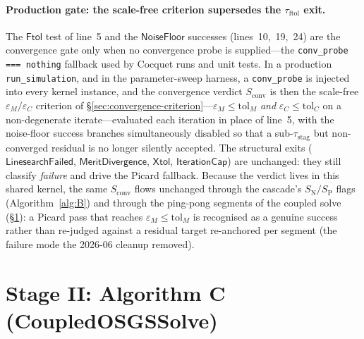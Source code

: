 \documentclass{article}
\newcommand{\code}[1]{\texttt{\small #1}}
\newcommand{\textftol}{\tau_{\mathrm{ftol}}}
\newcommand{\textstag}{\tau_{\mathrm{stag}}}
\begin{document}
\paragraph{Production gate: the scale-free criterion supersedes the $\textftol$ exit.}
The $\mathsf{Ftol}$ test of line~5 and the $\mathsf{NoiseFloor}$ successes
(lines~10,~19,~24) are the convergence gate only when no convergence probe is
supplied---the \code{conv\_probe === nothing} fallback used by Cocquet runs and unit
tests. In a production \code{run\_simulation}, and in the parameter-sweep harness, a
\code{conv\_probe} is injected into every kernel instance, and the convergence
verdict $S_{\mathrm{conv}}$ is then the scale-free $\varepsilon_M/\varepsilon_C$
criterion of §\ref{sec:convergence-criterion}---$\varepsilon_M\le\mathrm{tol}_M$
\emph{and} $\varepsilon_C\le\mathrm{tol}_C$ on a non-degenerate iterate---evaluated
each iteration in place of line~5, with the noise-floor success branches
simultaneously disabled so that a sub-$\textstag$ but non-converged residual is no
longer silently accepted. The structural exits ($\mathsf{LinesearchFailed}$,
$\mathsf{MeritDivergence}$, $\mathsf{Xtol}$, $\mathsf{IterationCap}$) are unchanged:
they still classify \emph{failure} and drive the Picard fallback. Because the verdict
lives in this shared kernel, the same $S_{\mathrm{conv}}$ flows unchanged through the
cascade's $S_{\mathrm{N}}/S_{\mathrm{P}}$ flags (Algorithm~\ref{alg:B}) and through
the ping-pong segments of the coupled solve (§\ref{sec:osgs}): a Picard pass that
reaches $\varepsilon_M\le\mathrm{tol}_M$ is recognised as a genuine success rather
than re-judged against a residual target re-anchored per segment (the failure mode
the 2026-06 cleanup removed).

\section{Stage II: Algorithm C (CoupledOSGSSolve)}
\label{sec:osgs}
\end{document}

